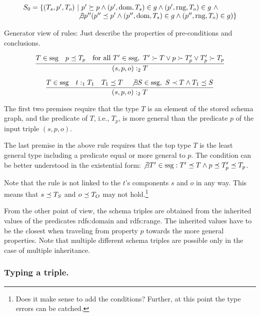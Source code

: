 \documentclass[runningheads]{llncs}
\newcommand{\nl}{\hfill\break}
\begin{document}
\begin{equation}
\begin{array}{l}
S_0 = \{(T_s,p',T_o)\ |\ p'\succeq\/p \land (p',\text{dom},T_s)\in\/g \land (p',\text{rng},T_o)\in\/g\ \land \\
\phantom{S = \{(T_s,p',T_o)\ |} \not\exists\/p''(p''\preceq\/p'\land(p'',\text{dom},T_s)\in\/g\land(p'',\text{rng},T_o)\in\/g)\}
\end{array}
\end{equation}

Generator view of rules: Just describe the properties of
pre-conditions and conclusions.

\begin{equation}
\dfrac{T\in\/\text{ssg}\quad p\preceq\/T_p\quad  
       \text{for all\ } T'\in\/\text{ssg},\ T'\succ\/T \lor p\succ\/T'_p\lor T'_p\succ\/T_p}
      {(s,p,o):_2\/T}
\end{equation}

\begin{equation}
\dfrac{T\in\/\text{ssg}\quad\/t:_1T_1\quad\/T_1\preceq\/T\quad  
       \not\exists\/S\in\/\text{ssg},\ S\prec\/T \land T_1\preceq\/S}
      {(s,p,o):_2\/T}
\end{equation}

The first two premises require that the type $T$ is an element of the
stored schema graph, and the predicate of $T$, i.e., $T_p$, is more
general than the predicate $p$ of the input triple $(s,p,o)$.

The last premise in the above rule requires that the top type $T$ is
the least general type including a predicate equal or more general to
$p$. The condition can be better understood in the existential form:
$\not\exists\/T'\in \text{ssg}: T'\preceq\/T\land
p\preceq\/T'_p\preceq\/T_p$.

Note that the rule is not linked to the $t$'s components $s$ and
$o$ in any way. This means that $s\preceq\/T_S$ and $o\preceq\/T_O$
may not hold.\footnote{Does it make sense to add the conditions? Further, at
this point the type errors can be catched.}

From the other point of view, the schema triples are obtained from the
inherited values of the predicates rdfs:domain and rdfs:range. The
inherited values have to be the closest when traveling from property
$p$ towards the more general properties. Note that multiple different
schema triples are possible only in the case of multiple inheritance.


\subsubsection{Typing a triple.}\nl
\end{document}

